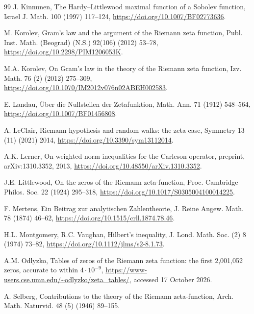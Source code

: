 \documentclass[preprint,12pt]{elsarticle}
\numberwithin{equation}{section}
\theoremstyle{plain}
\theoremstyle{definition}
\theoremstyle{remark}
\begin{document}
\begin{thebibliography}{99}
J. Kinnunen, The Hardy--Littlewood maximal function of a Sobolev function, Israel J. Math. 100 (1997) 117--124, \href{https://doi.org/10.1007/BF02773636}{https://doi.org/10.1007/BF02773636}.

M. Korolev, Gram's law and the argument of the Riemann zeta function, Publ. Inst. Math. (Beograd) (N.S.) 92(106) (2012) 53--78, \href{https://doi.org/10.2298/PIM1206053K}{https://doi.org/10.2298/PIM1206053K}.

M.A. Korolev, On Gram's law in the theory of the Riemann zeta function, Izv. Math. 76 (2) (2012) 275--309, \href{https://doi.org/10.1070/IM2012v076n02ABEH002583}{https://doi.org/10.1070/IM2012v076n02ABEH002583}.

E. Landau, \"Uber die Nullstellen der Zetafunktion, Math. Ann. 71 (1912) 548--564, \href{https://doi.org/10.1007/BF01456808}{https://doi.org/10.1007/BF01456808}.

A. LeClair, Riemann hypothesis and random walks: the zeta case, Symmetry 13 (11) (2021) 2014, \href{https://doi.org/10.3390/sym13112014}{https://doi.org/10.3390/sym13112014}.

A.K. Lerner, On weighted norm inequalities for the Carleson operator, preprint, arXiv:1310.3352, 2013, \href{https://doi.org/10.48550/arXiv.1310.3352}{https://doi.org/10.48550/arXiv.1310.3352}.

J.E. Littlewood, On the zeros of the Riemann zeta-function, Proc. Cambridge Philos. Soc. 22 (1924) 295--318, \href{https://doi.org/10.1017/S0305004100014225}{https://doi.org/10.1017/S0305004100014225}.

F. Mertens, Ein Beitrag zur analytischen Zahlentheorie, J. Reine Angew. Math. 78 (1874) 46--62, \href{https://doi.org/10.1515/crll.1874.78.46}{https://doi.org/10.1515/crll.1874.78.46}.

H.L. Montgomery, R.C. Vaughan, Hilbert's inequality, J. Lond. Math. Soc. (2) 8 (1974) 73--82, \href{https://doi.org/10.1112/jlms/s2-8.1.73}{https://doi.org/10.1112/jlms/s2-8.1.73}.

A.M. Odlyzko, Tables of zeros of the Riemann zeta function: the first 2,001,052 zeros, accurate to within $4\cdot10^{-9}$, \url{https://www-users.cse.umn.edu/~odlyzko/zeta_tables/}, accessed 17 October 2026.

A. Selberg, Contributions to the theory of the Riemann zeta-function, Arch. Math. Naturvid. 48 (5) (1946) 89--155.


\end{thebibliography}
\end{document}
